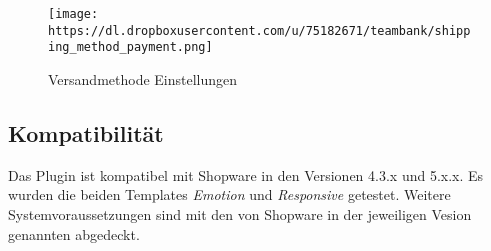 \begin{figure}[htbp]
\centering
\texttt{[image: https://dl.dropboxusercontent.com/u/75182671/teambank/shipping\_method\_payment.png]}
\caption{Versandmethode Einstellungen}
\end{figure}

\subsection{Kompatibilität}\label{kompatibilituxe4t}

Das Plugin ist kompatibel mit Shopware in den Versionen 4.3.x und 5.x.x.
Es wurden die beiden Templates \emph{Emotion} und \emph{Responsive}
getestet. Weitere Systemvoraussetzungen sind mit den von Shopware in der
jeweiligen Vesion genannten abgedeckt.
